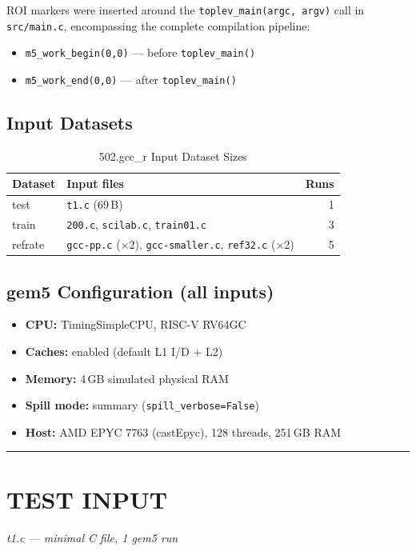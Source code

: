 \documentclass[conference]{IEEEtran}
\newcommand{\inputpart}[2]{%
    \vspace{1em}
    \noindent\rule{\linewidth}{0.4pt}
    \section{#1}
    \textit{#2}
    \vspace{0.2em}
}
\begin{document}
ROI markers were inserted around the \texttt{toplev\_main(argc, argv)}
call in \texttt{src/main.c}, encompassing the complete compilation
pipeline:
\begin{itemize}
    \item \texttt{m5\_work\_begin(0,0)} --- before \texttt{toplev\_main()}
    \item \texttt{m5\_work\_end(0,0)}   --- after  \texttt{toplev\_main()}
\end{itemize}

\subsection{Input Datasets}

\begin{table}[H]
\centering
\caption{502.gcc\_r Input Dataset Sizes}
\label{tab:inputs}
\begin{tabular}{llr}
\toprule
\textbf{Dataset} & \textbf{Input files} & \textbf{Runs} \\
\midrule
test    & \texttt{t1.c} (69\,B)       & 1 \\
train   & \texttt{200.c}, \texttt{scilab.c}, \texttt{train01.c} & 3 \\
refrate & \texttt{gcc-pp.c} (×2), \texttt{gcc-smaller.c},
          \texttt{ref32.c} (×2) & 5 \\
\bottomrule
\end{tabular}
\end{table}

\subsection{gem5 Configuration (all inputs)}

\begin{itemize}
    \item \textbf{CPU:} TimingSimpleCPU, RISC-V RV64GC
    \item \textbf{Caches:} enabled (default L1 I/D + L2)
    \item \textbf{Memory:} 4\,GB simulated physical RAM
    \item \textbf{Spill mode:} summary (\texttt{spill\_verbose=False})
    \item \textbf{Host:} AMD EPYC 7763 (castEpyc), 128 threads, 251\,GB RAM
\end{itemize}

\inputpart{TEST INPUT}{t1.c --- minimal C file, 1 gem5 run}
\end{document}
